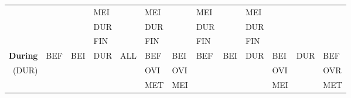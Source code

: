 \documentclass[11pt]{report}
\newenvironment{vvarmargin}[2]
{
  \begin{list}{}
  {
    \setlength{\topsep}{0pt}
    \setlength{\leftmargin}{0pt}
    \setlength{\rightmargin}{0pt}
    \setlength{\listparindent}{\parindent}
    \setlength{\itemindent}{\parindent}
    \setlength{\parsep}{0pt plus 1pt}
    \addtolength{\leftmargin}{#1}\addtolength{\rightmargin}{#2}
  }
  \item
}
{
  \end{list}
}
\begin{document}
\begin{table}[p]
\begin{vvarmargin}{-4cm}{-4cm}
\begin{center}
\begin{tabular}[t]{|r|l|l|l|l|l|l|l|l|l|l|l|l|}
                                        &                         &                         & MEI                     &                         & MEI                     &                         & MEI                     &                         & MEI                     &                         &                         &                         \\
                                        &                         &                         & DUR                     &                         & DUR                     &                         & DUR                     &                         & DUR                     &                         &                         &                         \\
                                        &                         &                         & FIN                     &                         & FIN                     &                         & FIN                     &                         & FIN                     &                         &                         &                         \\
                \hline                                                                                                                                                                                                                                                                                                                                         
                \textbf{During}         & BEF                     & BEI                     & DUR                     & ALL                     & BEF                     & BEI                     & BEF                     & BEI                     & DUR                     & BEI                     & DUR                     & BEF                     \\
                (DUR)                   &                         &                         &                         &                         & OVI                     & OVI                     &                         &                         &                         & OVI                     &                         & OVR                     \\
                                        &                         &                         &                         &                         & MET                     & MEI                     &                         &                         &                         & MEI                     &                         & MET                     \\

\end{tabular}
\end{center}
\end{vvarmargin}
\end{table}
\end{document}

